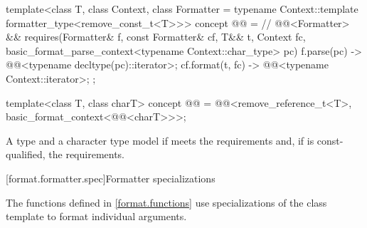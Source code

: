 \begin{codeblock}
template<class T, class Context,
         class Formatter = typename Context::template formatter_type<remove_const_t<T>>>
  concept @@ =                // \expos
    @@<Formatter> &&
    requires(Formatter& f, const Formatter& cf, T&& t, Context fc,
             basic_format_parse_context<typename Context::char_type> pc)
    {
      { f.parse(pc) } -> @@<typename decltype(pc)::iterator>;
      { cf.format(t, fc) } -> @@<typename Context::iterator>;
    };

template<class T, class charT>
  concept @@ =
    @@<remove_reference_t<T>, basic_format_context<@@<charT>>>;
\end{codeblock}

\pnum
A type  and a character type 
model 
if  meets
the  requirements
and, if  is const-qualified,
the  requirements.

[format.formatter.spec]{Formatter specializations}
%

\pnum
The functions defined in \ref{format.functions} use
specializations of the class template  to format
individual arguments.

